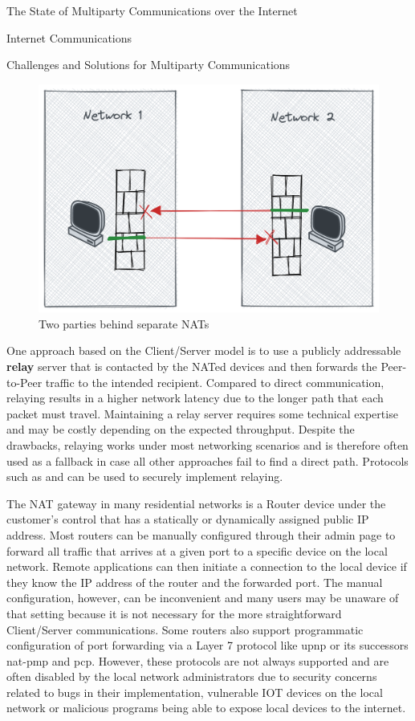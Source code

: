 \begin{frame}[fragile]{The State of Multiparty Communications over the Internet}
\begin{block}{Internet Communications}
\begin{block}{Challenges and Solutions for Multiparty Communications}
\begin{figure}
\centering
\includegraphics[width=\textwidth,height=0.25\textheight]{thesis/../figures/nat-intro.png}
\caption{Two parties behind separate NATs\label{nat-intro}}
\end{figure}

One approach based on the Client/Server model is to use a publicly addressable \textbf{relay} server that is contacted by the NATed devices and then forwards the Peer-to-Peer traffic to the intended recipient. Compared to direct communication, relaying results in a higher network latency due to the longer path that each packet must travel. Maintaining a relay server requires some technical expertise and may be costly depending on the expected throughput. Despite the drawbacks, relaying works under most networking scenarios and is therefore often used as a fallback in case all other approaches fail to find a direct path. Protocols such as  \autocite{turnRFC} and  \autocite{derpDocs} can be used to securely implement relaying.

The NAT gateway in many residential networks is a Router device under the customer's control that has a statically or dynamically assigned public IP address. Most routers can be manually configured through their admin page to forward all traffic that arrives at a given port to a specific device on the local network. Remote applications can then initiate a connection to the local device if they know the IP address of the router and the forwarded port. The manual configuration, however, can be inconvenient and many users may be unaware of that setting because it is not necessary for the more straightforward Client/Server communications. Some routers also support programmatic configuration of port forwarding via a Layer 7 protocol like \gls{upnp} or its successors \gls{nat-pmp} and \gls{pcp}. However, these protocols are not always supported and are often disabled by the local network administrators due to security concerns related to bugs in their implementation, vulnerable IOT devices on the local network or malicious programs being able to expose local devices to the internet.


\end{block}
\end{block}
\end{frame}
